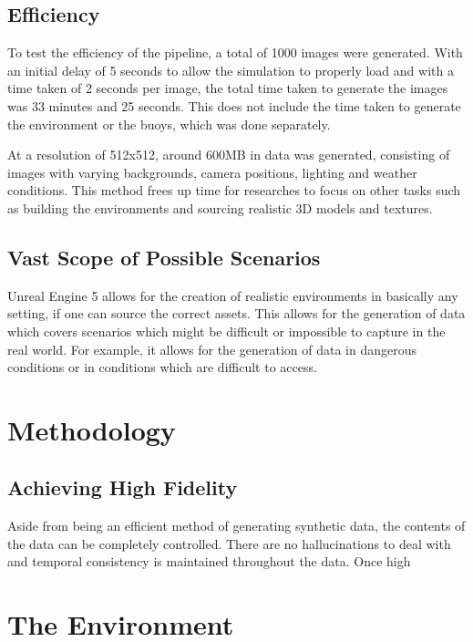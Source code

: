 \documentclass[10pt,twocolumn,letterpaper]{article}
\begin{document}
\subsection{Efficiency}

To test the efficiency of the pipeline, a total of 1000 images were generated. With an initial delay of 5 seconds to allow the simulation to properly load and with a time taken of 2 seconds per image, the total time taken to generate the images was 33 minutes and 25 seconds. This does not include the time taken to generate the environment or the buoys, which was done separately.

At a resolution of 512x512, around 600MB in data was generated, consisting of images with varying backgrounds, camera positions, lighting and weather conditions. This method frees up time for researches to focus on other tasks such as building the environments and sourcing realistic 3D models and textures. 

\subsection{Vast Scope of Possible Scenarios}

Unreal Engine 5 allows for the creation of realistic environments in basically any setting, if one can source the correct assets. This allows for the generation of data which covers scenarios which might be difficult or impossible to capture in the real world. For example, it allows for the generation of data in dangerous conditions or in conditions which are difficult to access.

\section{Methodology}

\subsection{Achieving High Fidelity} \label {sec:achieving_high_fidelity}



Aside from being an efficient method of generating synthetic data, the contents of the data can be completely controlled. There are no hallucinations to deal with and temporal consistency is maintained throughout the data. Once high 


\section{The Environment}
\end{document}
